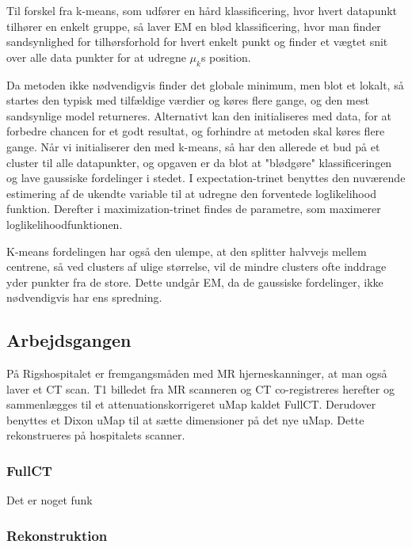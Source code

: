 Til forskel fra k-means, som udfører en hård klassificering, hvor hvert
datapunkt tilhører en enkelt gruppe, så laver EM en blød klassificering,
hvor
man finder sandsynlighed for tilhørsforhold for hvert enkelt punkt og
finder et
vægtet snit over alle data punkter for at udregne $\mu_k$s position.

Da metoden ikke nødvendigvis finder det globale minimum, men blot et
lokalt,
så startes den typisk med tilfældige værdier og køres flere gange, og
den mest sandsynlige model returneres. Alternativt kan den initialiseres
med
data, for at forbedre chancen for et godt resultat, og forhindre at
metoden
skal køres flere gange. Når vi initialiserer den med k-means, så har den
allerede et bud på et cluster til alle datapunkter, og opgaven er da blot
at "blødgøre" klassificeringen og lave gaussiske fordelinger i stedet. I
expectation-trinet benyttes den nuværende estimering af de ukendte
variable til
at udregne den forventede loglikelihood funktion. Derefter i
maximization-trinet findes de parametre, som maximerer
loglikelihoodfunktionen.

K-means fordelingen har også den ulempe, at den splitter halvvejs mellem
centrene, så ved clusters af ulige størrelse, vil de mindre clusters ofte
inddrage yder punkter fra de store. Dette undgår EM, da de gaussiske
fordelinger, ikke nødvendigvis har ens spredning.


\subsection{Arbejdsgangen}


På Rigshospitalet er fremgangsmåden med MR
hjerneskanninger, at man også laver et CT scan. T1 billedet fra MR scanneren
og CT co-registreres herefter og sammenlægges til et attenuationskorrigeret
uMap kaldet FullCT. Derudover benyttes et Dixon uMap til at sætte dimensioner
på det nye uMap. Dette rekonstrueres på hospitalets scanner.


\subsubsection{FullCT}


Det er noget funk

\subsubsection{Rekonstruktion}

